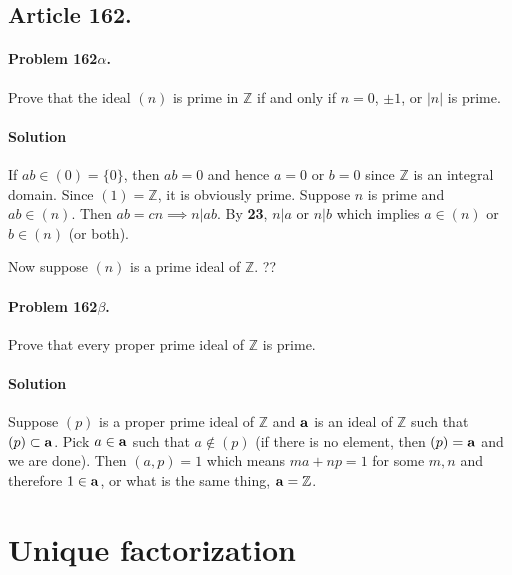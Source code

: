 \subsection{Article 162.}

\paragraph{Problem 162$\alpha$.}
Prove that the ideal $(n)$ is prime in $\mathbb{Z}$ if and only if $ n =
0$, $\pm 1$, or $|n|$ is prime.

\paragraph*{Solution}
If $ab \in (0) = \{0\}$, then $ab = 0$ and hence $a=0$ or $b=0$ since
$\mathbb{Z}$ is an integral domain. Since $(1) = \mathbb{Z}$, it is
obviously prime. Suppose $n$ is prime and $ab \in (n)$. Then $ab = cn
\implies n | ab$. By \textbf{23}, $n | a$ or $n | b$ which implies $a
\in (n)$ or $b \in (n)$ (or both).

Now suppose $(n)$ is a prime ideal of $\mathbb{Z}$. ??

\paragraph{Problem 162$\beta$.}
Prove that every proper prime ideal of $\mathbb{Z}$ is prime.

\paragraph*{Solution}
Suppose $(p)$ is a proper prime ideal of $\mathbb{Z}$ and $\mathsf{\mathbf{a}}$
is an ideal of $\mathbb{Z}$ such that $(p) \subset \mathsf{\mathbf{a}}$. Pick $a
\in \mathsf{\mathbf{a}}$ such that $a \notin (p)$ (if there is no element, then
$(p) = \mathsf{\mathbf{a}}$ and we are done). Then $(a,p) = 1$ which means $ma +
np = 1$ for some $m, n$ and therefore $1 \in \mathsf{\mathbf{a}}$, or what is
the same thing, $\mathsf{\mathbf{a}} = \mathbb{Z}$.

\section{Unique factorization}

